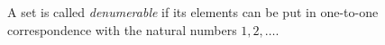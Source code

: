 A set is called \textit{denumerable} if its elements can be put in one-to-one correspondence with the natural numbers $1, 2, \dots$.
